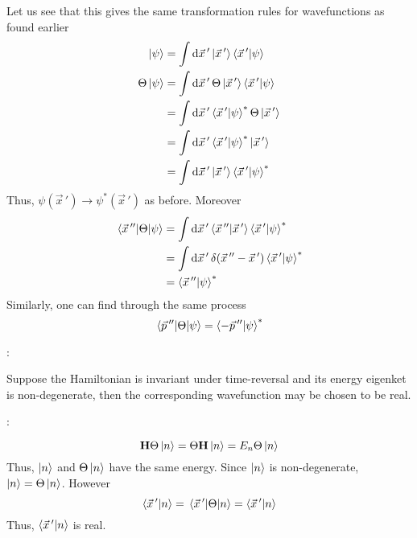 \documentclass[12pt,a4paper,titlepage]{article}
\newcommand{\ul}[1]{\underline{\smash{#1}}} %
\newcommand{\theorem}[1]{%
	\ul{Theorem}:\hfill
	\begin{minipage}[t]{\dimexpr\linewidth-8em\relax}
	#1
	\end{minipage}\hspace{4em}\bigskip
}
\newcommand{\proof}[1]{%
	\ul{Proof}:\hfill
	\begin{minipage}[t]{\dimexpr\linewidth-8em\relax}
	#1
	\end{minipage}\hspace{4em}\bigskip
}
\begin{document}
Let us see that this gives the same transformation rules for wavefunctions as found earlier
\begin{equation}
\begin{aligned}
\ket{\psi}&=\int\dd{\vec{x}\,'}\ket{\vec{x}\,'}\ip{\vec{x}\,'}{\psi}\\
\Theta\ket{\psi}&=\int\dd{\vec{x}\,'}\Theta\ket{\vec{x}\,'}\ip{\vec{x}\,'}{\psi}\\
&=\int\dd{\vec{x}\,'}\ip{\vec{x}\,'}{\psi}^{*}\Theta\ket{\vec{x}\,'}\\
&=\int\dd{\vec{x}\,'}\ip{\vec{x}\,'}{\psi}^{*}\ket{\vec{x}\,'}\\
&=\int\dd{\vec{x}\,'}\ket{\vec{x}\,'}\ip{\vec{x}\,'}{\psi}^{*}
\end{aligned}
\end{equation}
Thus, $\psi(\vec{x}\,')\rightarrow\psi^{*}(\vec{x}\,')$ as before. Moreover
\begin{equation}
\begin{aligned}
\mel{\vec{x}\,''}{\Theta}{\psi}&=\int\dd{\vec{x}\,'}\ip{\vec{x}\,''}{\vec{x}\,'}\ip{\vec{x}\,'}{\psi}^{*}\\
&=\int\dd{\vec{x}\,'}\delta(\vec{x}\,''-\vec{x}\,')\ip{\vec{x}\,'}{\psi}^{*}\\
&=\ip{\vec{x}\,''}{\psi}^{*}
\end{aligned}
\end{equation}
Similarly, one can find through the same process
\begin{equation}
\mel{\vec{p}\,''}{\Theta}{\psi}=\ip{-\vec{p}\,''}{\psi}^{*}
\end{equation}

\theorem{Suppose the Hamiltonian is invariant under time-reversal and its energy eigenket is non-degenerate, then the corresponding wavefunction may be chosen to be real.}

\proof{\begin{equation}
\vb{H}\Theta\ket{n}=\Theta\vb{H}\ket{n}=E_{n}\Theta\ket{n}
\end{equation}
Thus, $\ket{n}$ and $\Theta\ket{n}$ have the same energy. Since $\ket{n}$ is non-degenerate, $\ket{n}=\Theta\ket{n}$. However
\begin{equation}
\ip{\vec{x}\,'}{n}=\mel{\vec{x}\,'}{\Theta}{n}=\ip{\vec{x}\,'}{n}
\end{equation}
Thus, $\ip{\vec{x}\,'}{n}$ is real.
}
\end{document}
